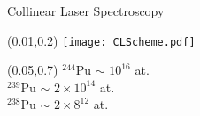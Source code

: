 \documentclass[10pt,aspectratio=169]{beamer}
\begin{document}
\begin{frame}{Collinear Laser Spectroscopy}
	\begin{textblock*}{0.4\paperwidth}(0.01\paperwidth,0.2\paperheight)
		\texttt{[image: CLScheme.pdf]}
	\end{textblock*}
	\begin{textblock*}{0.3\paperwidth}(0.05\paperwidth,0.7\paperheight)
		$^{244}$Pu $\sim$ $10^{16}$ at.\\
		$^{239}$Pu $\sim$ $2\times10^{14}$ at.\\
		$^{238}$Pu $\sim$ $2\times8^{12}$ at.\\
	\end{textblock*}
\end{frame}
\end{document}
